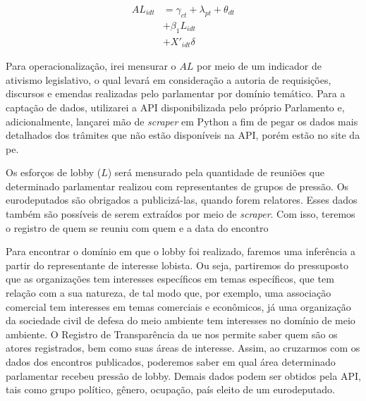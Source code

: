 \begin{equation}
    \begin{split}
        AL_{idt} &= \gamma_{ct} + \lambda_{pt} + \theta_{dt}\\
        &+ \beta_1 L_{idt}\\
        &+ X'_{idt} \delta
    \end{split}
\end{equation}






Para operacionalização, irei mensurar o $AL$ por meio de um indicador de ativismo legislativo, o qual levará em consideração a autoria de requisições, discursos e emendas realizadas pelo parlamentar por domínio temático. Para a captação de dados, utilizarei a API disponibilizada pelo próprio Parlamento e, adicionalmente, lançarei mão de \textit{scraper} em Python a fim de pegar os dados mais detalhados dos trâmites que não estão disponíveis na API, porém estão no site da \acrshort{pe}.

Os esforços de lobby ($L$) será mensurado pela quantidade de reuniões que determinado parlamentar realizou com representantes de grupos de pressão. Os eurodeputados são obrigados a publicizá-las, quando forem relatores. Esses dados também são possíveis de serem extraídos por meio de \textit{scraper}. Com isso, teremos o registro de quem se reuniu com quem e a data do encontro%

Para encontrar o domínio em que o lobby foi realizado, faremos uma inferência a partir do representante de interesse lobista. Ou seja, partiremos do pressuposto que as organizações tem interesses específicos em temas específicos, que tem relação com a sua natureza, de tal modo que, por exemplo, uma associação comercial tem interesses em temas comerciais e econômicos, já uma organização da sociedade civil de defesa do meio ambiente tem interesses no domínio de meio ambiente. O Registro de Transparência da \acrshort{ue} nos permite saber quem são os atores registrados, bem como suas áreas de interesse. Assim, ao cruzarmos com os dados dos encontros publicados, poderemos saber em qual área determinado parlamentar recebeu pressão de lobby. Demais dados podem ser obtidos pela API, tais como grupo político, gênero, ocupação, país eleito de um eurodeputado. 




